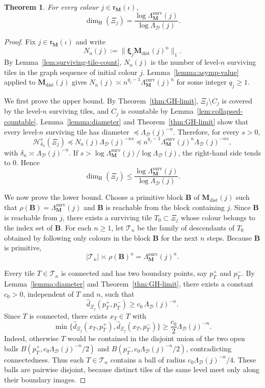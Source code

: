 \documentclass[12pt]{iopart}
\newtheorem{theorem}{Theorem}[section]
\newcommand*{\dist}{d}
\newcommand*{\bbbxi}{\boldsymbol{\xi}}
\newcommand*{\dimh}{\dim_\mathrm{H}}
\begin{document}
\begin{theorem}\label{thm:singlefractal}
For every colour $j\in\mathfrak r_{\mathbf M}(\iota)$,
\[
\dimh(\Xi_j)
=
\frac{
\log \Lambda_{\mathbf M}^{\mathrm{surv}}(j)
}{
\log \Lambda_{\mathcal D}(j)
}.
\]
\end{theorem}

\begin{proof}
Fix $j\in\mathfrak r_{\mathbf M}(\iota)$ and write
\[
N_n(j):=
\big\|
\bbbxi_j\mathbf M_{\mathrm{dist}}(j)^n
\big\|_1.
\]
By Lemma~\ref{lem:surviving-tile-count}, $N_n(j)$ is the number of level-$n$ surviving tiles in the graph sequence of initial colour $j$.
Lemma~\ref{lemma:asymp-value} applied to $\mathbf M_{\mathrm{dist}}(j)$ gives
$N_n(j)\asymp n^{q_j-1}\Lambda_{\mathbf M}^{\mathrm{surv}}(j)^n$ for some integer $q_j\ge 1$.

We first prove the upper bound.
By Theorem~\ref{thm:GH-limit}, $\Xi_j\setminus C_j$ is covered by the level-$n$ surviving tiles, and
$C_j$ is countable by Lemma~\ref{lem:collapsed-countable}.
Lemma~\ref{lemma:diameter} and Theorem~\ref{thm:GH-limit} show that every level-$n$ surviving tile has diameter
$\preceq \Lambda_{\mathcal D}(j)^{-n}$.
Therefore, for every $s>0$,
\[
\mathcal H^s_{\delta_n}(\Xi_j)
\preceq
N_n(j)\Lambda_{\mathcal D}(j)^{-ns}
\preceq
n^{q_j-1}\Lambda_{\mathbf M}^{\mathrm{surv}}(j)^n\Lambda_{\mathcal D}(j)^{-ns},
\]
with $\delta_n\asymp \Lambda_{\mathcal D}(j)^{-n}$.
If $s>\log\Lambda_{\mathbf M}^{\mathrm{surv}}(j)/\log\Lambda_{\mathcal D}(j)$, the right-hand side tends to $0$.
Hence
\[
\dimh(\Xi_j)
\le
\frac{\log \Lambda_{\mathbf M}^{\mathrm{surv}}(j)}{\log \Lambda_{\mathcal D}(j)}.
\]

We now prove the lower bound.
Choose a primitive block $\mathbf B$ of $\mathbf M_{\mathrm{dist}}(j)$ such that
$\rho(\mathbf B)=\Lambda_{\mathbf M}^{\mathrm{surv}}(j)$ and $\mathbf B$ is reachable from the block containing $j$.
Since $\mathbf B$ is reachable from $j$, there exists a surviving tile $T_0\subset \Xi_j$ whose colour belongs to the index set of $\mathbf B$.
For each $n\ge 1$, let $\mathcal T_n$ be the family of descendants of $T_0$ obtained by following only colours in the block $\mathbf B$ for the next $n$ steps.
Because $\mathbf B$ is primitive,
\[
|\mathcal T_n|
\asymp
\rho(\mathbf B)^n
=
\Lambda_{\mathbf M}^{\mathrm{surv}}(j)^n.
\]

Every tile $T\in\mathcal T_n$ is connected and has two boundary points, say $p_T^+$ and $p_T^-$.
By Lemma~\ref{lemma:diameter} and Theorem~\ref{thm:GH-limit}, there exists a constant $c_0>0$, independent of $T$ and $n$, such that
\[
\hat\dist_{\Xi_j}(p_T^+,p_T^-)\ge c_0\,\Lambda_{\mathcal D}(j)^{-n}.
\]
Since $T$ is connected, there exists $x_T\in T$ with
\[
\min\big\{
\hat\dist_{\Xi_j}(x_T,p_T^+),
\hat\dist_{\Xi_j}(x_T,p_T^-)
\big\}
\ge
\frac{c_0}{2}\Lambda_{\mathcal D}(j)^{-n}.
\]
Indeed, otherwise $T$ would be contained in the disjoint union of the two open balls
$B(p_T^+,c_0\Lambda_{\mathcal D}(j)^{-n}/2)$ and
$B(p_T^-,c_0\Lambda_{\mathcal D}(j)^{-n}/2)$, contradicting connectedness.
Thus each $T\in\mathcal T_n$ contains a ball of radius
$c_0\Lambda_{\mathcal D}(j)^{-n}/4$.
These balls are pairwise disjoint, because distinct tiles of the same level meet only along their boundary images.


\end{proof}
\end{document}

